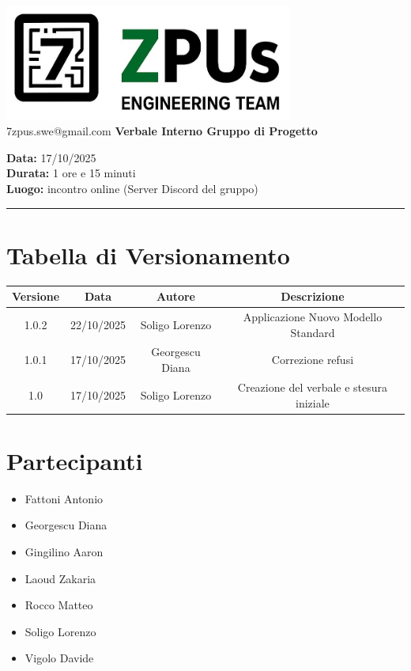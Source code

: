 \documentclass[a4paper,12pt]{article}
\begin{document}
\begin{center}
    \includegraphics[width=9.5cm]{../../../assets/logo7ZPUs.jpg}\\
    \small\hspace{10cm} 7zpus.swe@gmail.com
    \vspace{0.5cm}
    \Large \textbf{Verbale Interno Gruppo di Progetto}\\

\end{center}

\noindent
\textbf{Data:} 17/10/2025 \\
\textbf{Durata:} 1 ore e 15 minuti \\
\textbf{Luogo:} incontro online (Server Discord del gruppo)

\vspace{0.3cm}
\hrule
\vspace{0.5cm}

\tableofcontents

\newpage

\section{Tabella di Versionamento}
\begin{tabular}{|c|c|c|c|}
    \hline
    \textbf{Versione} & \textbf{Data} & \textbf{Autore} & \textbf{Descrizione}                     \\
    \hline
    1.0.2             & 22/10/2025    & Soligo Lorenzo  & Applicazione Nuovo Modello Standard      \\
    \hline
    1.0.1             & 17/10/2025    & Georgescu Diana & Correzione refusi                        \\
    \hline
    1.0               & 17/10/2025    & Soligo Lorenzo  & Creazione del verbale e stesura iniziale \\
    \hline

\end{tabular}

\section{Partecipanti}
\begin{itemize}[noitemsep]
    \item Fattoni Antonio
    \item Georgescu Diana
    \item Gingilino Aaron
    \item Laoud Zakaria
    \item Rocco Matteo
    \item Soligo Lorenzo
    \item Vigolo Davide
\end{itemize}
\end{document}
